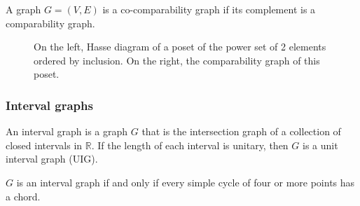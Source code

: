 \begin{defn}
  A graph $G = (V,E)$ is a co-comparability graph if its complement is a comparability graph.
\end{defn}

\begin{figure}
\centering

\begin{scaletikzpicturetowidth}{\textwidth}
\end{scaletikzpicturetowidth}

\caption{On the left, Hasse diagram of a poset of the power set of 2 elements ordered by inclusion.
On the right, the comparability graph of this poset.}
\label{fig:hasse}
\end{figure}

\subsubsection{Interval graphs}

An interval graph is a graph $G$ that is the intersection graph of a collection
of closed intervals in $\mathbb{R}$. If the length of each interval is unitary,
then $G$ is a unit interval graph (UIG).

\begin{theorem}
  $G$ is an interval graph if and only if every simple cycle of four or more
  points has a chord. \cite{FISHBURN1985135}
\end{theorem}

